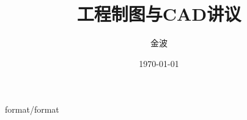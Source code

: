 \documentclass[12pt,twoside]{book}
\begin{document}
\begin{CJK}{UTF8}{song}
 {format/format}
\title{工程制图与CAD讲议}
\author{金波}
\date{\today}
\maketitle
\CJKtilde
\frontmatter
\tableofcontents
\mainmatter
\graphicspath{{cad/pdf/}{cad/png/}}











% 
% 
% 
% 
% 
% 
% 
% 
% 
% 
% 
% 
%
%

\newpage
\end{CJK}
\end{document}
